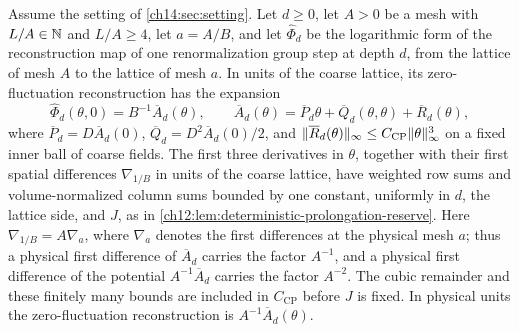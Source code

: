 \begin{lemma}\label{ch14:lem:signed-physical-columns}
Assume the setting of \cref{ch14:sec:setting}. Let $d\ge0$, let $A>0$ be a mesh with $L/A\in\mathbb N$ and $L/A\ge4$, let $a=A/B$, and let $\widehat\Phi_d$ be the logarithmic form of the reconstruction map of one renormalization group step at depth $d$, from the lattice of mesh $A$ to the lattice of mesh $a$. In units of the coarse lattice, its zero-fluctuation reconstruction has the expansion
\[
 \widehat\Phi_d(\theta,0)=B^{-1}\overline A_d(\theta),\qquad\overline A_d(\theta)=\overline P_d\theta+\overline Q_d(\theta,\theta)+\overline R_d(\theta),
\]
where $\overline P_d=D\overline A_d(0)$, $\overline Q_d=D^2\overline A_d(0)/2$, and $\lVert \overline R_d(\theta)\rVert_\infty\le C_{\mathrm{CP}}\lVert \theta\rVert_\infty^3$ on a fixed inner ball of coarse fields. The first three derivatives in $\theta$, together with their first spatial differences $\nabla_{1/B}$ in units of the coarse lattice, have weighted row sums and volume-normalized column sums bounded by one constant, uniformly in $d$, the lattice side, and $J$, as in \cref{ch12:lem:deterministic-prolongation-reserve}. Here $\nabla_{1/B}=A\nabla_a$, where $\nabla_a$ denotes the first differences at the physical mesh $a$; thus a physical first difference of $\overline A_d$ carries the factor $A^{-1}$, and a physical first difference of the potential $A^{-1}\overline A_d$ carries the factor $A^{-2}$. The cubic remainder and these finitely many bounds are included in $C_{\mathrm{CP}}$ before $J$ is fixed. In physical units the zero-fluctuation reconstruction is $A^{-1}\overline A_d(\theta)$.


\end{lemma}
